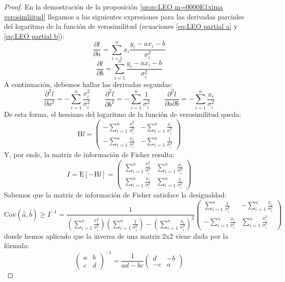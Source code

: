 \documentclass[11pt,a4paper,spanish]{article}
\numberwithin{equation}{section}
\numberwithin{table}{section}
\numberwithin{figure}{section}
\theoremstyle{definition}
\theoremstyle{remark}
\theoremstyle{definition}
\theoremstyle{remark}
\theoremstyle{plain}
\theoremstyle{plain}
\theoremstyle{plain}
\theoremstyle{plain}
\theoremstyle{plain}
\theoremstyle{plain}
\begin{document}
	\begin{proof}
		En la demostración de la proposición \vref{prop:LEO m=0000E1xima verosimliitud}
		llegamos a las siguientes expresiones para las derivadas parciales
		del logaritmo de la función de verosimilitud (ecuaciones \vref{eq:LEO partial a}
		y \vref{eq:LEO partial b}):
		\[
		\frac{\partial l}{\partial a}=\sum_{i=1}^{n}x_{i}\frac{y_{i}-ax_{i}-b}{\sigma_{i}^{2}}
		\]
		\[
		\frac{\partial l}{\partial b}=\sum_{i=1}^{n}\frac{y_{i}-ax_{i}-b}{\sigma_{i}^{2}}
		\]
		A continuación, debemos hallar las derivadas segundas:
		\[
		\frac{\partial^{2}l}{\partial a^{2}}=-\sum_{i=1}^{n}\frac{x_{i}^{2}}{\sigma_{i}^{2}}\qquad\frac{\partial^{2}l}{\partial b^{2}}=-\sum_{i=1}^{n}\frac{1}{\sigma_{i}^{2}}\qquad\frac{\partial^{2}l}{\partial a\partial b}=-\sum_{i=1}^{n}\frac{x_{i}}{\sigma_{i}^{2}}
		\]
		De esta forma, el hessiano del logaritmo de la función de verosimilitud
		queda:
		\[
		\mathrm{H}l=\left(\begin{matrix}-\sum_{i=1}^{n}\frac{x_{i}^{2}}{\sigma_{i}^{2}} & -\sum_{i=1}^{n}\frac{x_{i}}{\sigma_{i}^{2}}\\
			-\sum_{i=1}^{n}\frac{x_{i}}{\sigma_{i}^{2}} & -\sum_{i=1}^{n}\frac{1}{\sigma_{i}^{2}}
		\end{matrix}\right)
		\]
		Y, por ende, la matriz de información de Fisher resulta:
		\[
		I=\mathrm{E}\left[-\mathrm{H}l\right]=\left(\begin{matrix}\sum_{i=1}^{n}\frac{x_{i}^{2}}{\sigma_{i}^{2}} & \sum_{i=1}^{n}\frac{x_{i}}{\sigma_{i}^{2}}\\
			\sum_{i=1}^{n}\frac{x_{i}}{\sigma_{i}^{2}} & \sum_{i=1}^{n}\frac{1}{\sigma_{i}^{2}}
		\end{matrix}\right)
		\]
		Sabemos que la matriz de información de Fisher satisface la desigualdad:
		\[
		\mathrm{Cov}\left(\hat{a},\hat{b}\right)\ge I^{-1}=\frac{1}{\left(\sum_{i=1}^{n}\frac{x_{i}^{2}}{\sigma_{i}^{2}}\right)\left(\sum_{i=1}^{n}\frac{1}{\sigma_{i}^{2}}\right)-\left(\sum_{i=1}^{n}\frac{x_{i}}{\sigma_{i}^{2}}\right)^{2}}\left(\begin{matrix}\sum_{i=1}^{n}\frac{1}{\sigma_{i}^{2}} & -\sum_{i=1}^{n}\frac{x_{i}}{\sigma_{i}^{2}}\\
			-\sum_{i=1}^{n}\frac{x_{i}}{\sigma_{i}^{2}} & \sum_{i=1}^{n}\frac{x_{i}^{2}}{\sigma_{i}^{2}}
		\end{matrix}\right)
		\]
		donde hemos aplicado que la inversa de una matriz 2x2 viene dada por
		la fórmula:
		\[
		\left(\begin{matrix}a & b\\
			c & d
		\end{matrix}\right)^{-1}=\frac{1}{ad-bc}\left(\begin{matrix}d & -b\\
			-c & a
		\end{matrix}\right)
		\]
	\end{proof}
\end{document}
